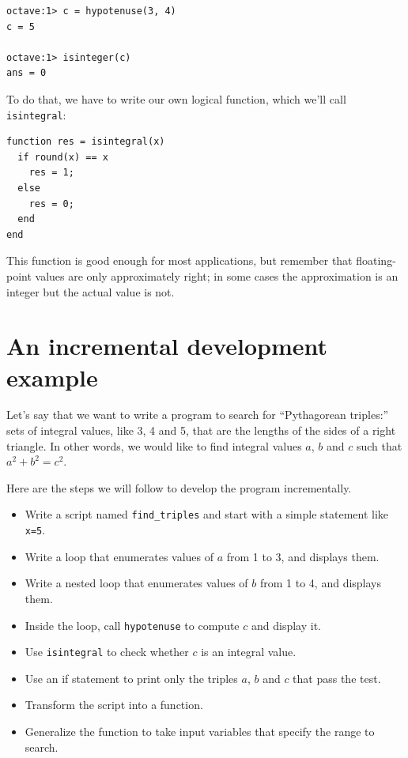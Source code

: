 \documentclass{book}
\begin{document}
\begin{verbatim}
octave:1> c = hypotenuse(3, 4)
c = 5

octave:1> isinteger(c)
ans = 0
\end{verbatim}

To do that, we have to write our own logical function, which
we'll call {\tt isintegral}:

\begin{verbatim}
function res = isintegral(x)
  if round(x) == x
    res = 1;
  else
    res = 0;
  end
end
\end{verbatim}

This function is good enough for most applications, but remember
that floating-point values are only approximately right; in some
cases the approximation is an integer but the actual
value is not.


\section{An incremental development example}
\label{increxample}

Let's say that we want to write a program to search for ``Pythagorean
triples:'' sets of integral values, like 3, 4 and 5,
that are the lengths of the sides of a right triangle. In other
words, we would like to find integral values $a$, $b$ and $c$ such
that $a^2 + b^2 = c^2$.

Here are the steps we will follow to develop the program incrementally.

\begin{itemize}

\item Write a script named {\tt find\_triples} and start with a simple
statement like {\tt x=5}.

\item Write a loop that enumerates values of $a$ from 1 to 3, and
displays them.

\item Write a nested loop that enumerates values of $b$ from 1 to 4,
and displays them.

\item Inside the loop, call {\tt hypotenuse} to compute $c$ and
display it.

\item Use {\tt isintegral} to check whether $c$ is an integral
value.

\item Use an if statement to print only the triples $a$, $b$ and $c$
that pass the test.

\item Transform the script into a function.

\item Generalize the function to take input variables that
specify the range to search.

\end{itemize}
\end{document}
